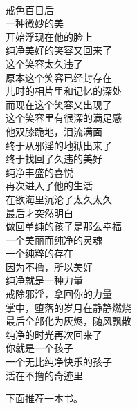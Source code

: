 \begin{poem}
    \begin{multicols}{3}
        \centering~\\
        戒色百日后 \\ 一种微妙的美 \\ 开始浮现在他的脸上 \\ 纯净美好的笑容又回来了 \\ 这个笑容太久违了 \\ 原本这个笑容已经封存在 \\ 儿时的相片里和记忆的深处 \\ 而现在这个笑容又出现了 \\ 这个笑容里有很深的满足感 \\ 他双膝跪地，泪流满面 \\ 终于从邪淫的地狱出来了 \\ 终于找回了久违的美好 \\ 纯净丰盛的喜悦 \\ 再次进入了他的生活 \\ 在欲海里沉沦了太久太久 \\ 最后才突然明白 \\ 做回单纯的孩子是那么幸福 \\ 一个美丽而纯净的灵魂 \\ 一个纯粹的存在 \\ 因为不撸，所以美好 \\ 纯净就是一种力量 \\ 戒除邪淫，拿回你的力量 \\ 掌中，堕落的岁月在静静燃烧 \\ 最后全部化为灰烬，随风飘散 \\ 纯净的时光再次回来了 \\ 你就是一个孩子 \\ 一个无比纯净快乐的孩子 \\ 活在不撸的奇迹里
    \end{multicols}
\end{poem}

下面推荐一本书。


